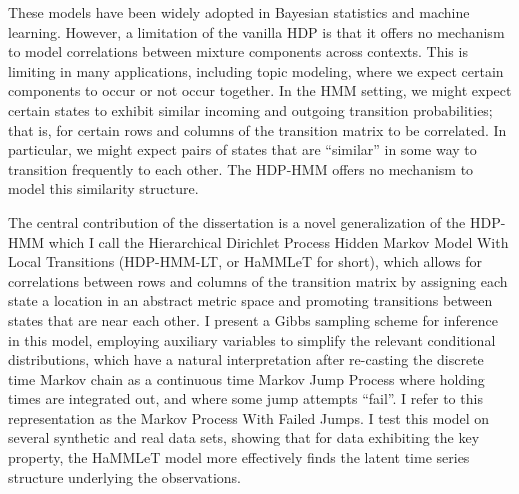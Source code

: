 These models have been widely adopted in Bayesian statistics and
machine learning.  However, a limitation of the vanilla HDP
is that it offers no mechanism to model correlations between mixture
components across contexts.  %
This is limiting in many applications, including topic modeling,
where we expect certain components to occur or not occur
together.  In the HMM setting, we might expect certain states to
exhibit similar incoming and outgoing transition probabilities; 
that is, for certain rows and columns of the transition
matrix to be correlated.  In particular, we might expect pairs of states that are
``similar'' in some way to transition frequently to each other.  The
HDP-HMM offers no mechanism to model this similarity structure.


The central contribution of the dissertation is a novel generalization
of the HDP-HMM which I call the Hierarchical Dirichlet Process Hidden Markov Model With Local
Transitions (HDP-HMM-LT, or HaMMLeT for short), 
which allows for correlations between rows and columns of the
transition matrix by assigning each state a location in an abstract metric 
space and promoting transitions between states
that are near each other.  I present a Gibbs sampling scheme
for inference in this model, employing auxiliary variables to simplify 
the relevant conditional distributions, which have a natural
interpretation after re-casting the discrete time Markov chain as a 
continuous time Markov Jump Process where holding times are integrated
out, and where some jump attempts ``fail''.  I refer to this 
representation as the Markov Process With Failed Jumps.
I test this model on several synthetic and real data sets, showing
that for data exhibiting the key property, the HaMMLeT model more
effectively finds the latent time series structure underlying the observations.



